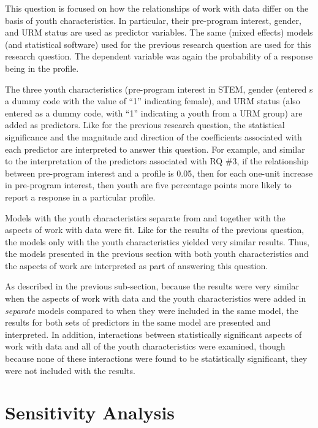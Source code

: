 \documentclass[]{msu-thesis}
\theoremstyle{definition}
\theoremstyle{definition}
\theoremstyle{definition}
\theoremstyle{remark}
\begin{document}
This question is focused on how the relationships of work with data
differ on the basis of youth characteristics. In particular, their
pre-program interest, gender, and URM status are used as predictor
variables. The same (mixed effects) models (and statistical software)
used for the previous research question are used for this research
question. The dependent variable was again the probability of a response
being in the profile.

The three youth characteristics (pre-program interest in STEM, gender
(entered s a dummy code with the value of ``1'' indicating female), and
URM status (also entered as a dummy code, with ``1'' indicating a youth
from a URM group) are added as predictors. Like for the previous
research question, the statistical significance and the magnitude and
direction of the coefficients associated with each predictor are
interpreted to answer this question. For example, and similar to the
interpretation of the predictors associated with RQ \#3, if the
relationship between pre-program interest and a profile is 0.05, then
for each one-unit increase in pre-program interest, then youth are five
percentage points more likely to report a response in a particular
profile.

Models with the youth characteristics separate from and together with
the aspects of work with data were fit. Like for the results of the
previous question, the models only with the youth characteristics
yielded very similar results. Thus, the models presented in the previous
section with both youth characteristics and the aspects of work are
interpreted as part of answering this question.

As described in the previous sub-section, because the results were very
similar when the aspects of work with data and the youth characteristics
were added in \emph{separate} models compared to when they were included
in the same model, the results for both sets of predictors in the same
model are presented and interpreted. In addition, interactions between
statistically significant aspects of work with data and all of the youth
characteristics were examined, though because none of these interactions
were found to be statistically significant, they were not included with
the results.

\section{Sensitivity Analysis}\label{sensitivity-analysis}
\end{document}
